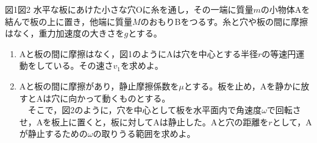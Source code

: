 \hakosyokika
\item
    \begin{mawarikomi}{150pt}{図1図2}
        水平な板にあけた小さな穴Oに糸を通し，その一端に質量$m$の小物体Aを結んで板の上に置き，他端に質量$M$のおもりBをつるす。糸と穴や板の間に摩擦はなく，重力加速度の大きさを$g$とする。
        \begin{enumerate}
            \item Aと板の間に摩擦はなく，図1のようにAは穴を中心とする半径$r$の等速円運動をしている。その速さ$v_1$を求めよ。
            \item Aと板の間に摩擦があり，静止摩擦係数を$\mu $とする。板を止め，Aを静かに放すとAは穴に向かって動くものとする。\\
            ~~そこで，図2のように，穴を中心として板を水平面内で角速度$\omega $で回転させ，Aを板上に置くと，板に対してAは静止した。Aと穴の距離を$r$として，Aが静止するための$\omega $の取りうる範囲を求めよ。
        \end{enumerate}
    \end{mawarikomi}